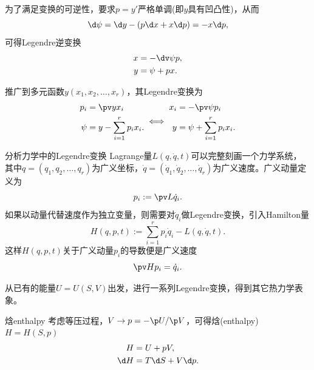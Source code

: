 \begin{corollary}
	为了满足变换的可逆性，要求$p=y'$严格单调(即$y$具有凹凸性)，从而
	\[
		\d\psi=\d y-(p\d x+x\d p)=-x\d p,
	\]
	可得Legendre逆变换
	\begin{subequations}
		\begin{align}
			x&=-\dv\psi p,\\
			y&=\psi+px.
		\end{align}
	\end{subequations}
\end{corollary}

\begin{corollary}
	推广到多元函数$y(x_1,x_2,\ldots,x_r)$，其Legendre变换为
	\[
		\begin{aligned}
			p_i  & =\pv y{x_i}            \\
			\psi & =y-\sum_{i=1}^rp_ix_i.
		\end{aligned}
		\iff
		\begin{aligned}
			x_i & =-\pv\psi{p_i}            \\
			y   & =\psi+\sum_{i=1}^rp_ix_i.
		\end{aligned}
	\]
\end{corollary}

\begin{example}{分析力学中的Legendre变换}{}
	Lagrange量$L(q,\dot q,t)$可以完整刻画一个力学系统，
	其中$q=(q_1,q_2,\ldots,q_r)$为广义坐标，$\dot q=(\dot q_1,\dot q_2,\ldots,\dot q_r)$为广义速度。广义动量定义为
	\[
		p_i:=\pv L{\dot q_i}.
	\]
	如果以动量代替速度作为独立变量，则需要对$\dot q_i$做Legendre变换，引入Hamilton量
	\begin{equation}
		H(q,p,t):=\sum_{i=1}^rp_i\dot q_i-L(q,\dot q,t).
	\end{equation}
	这样$H(q,p,t)$关于广义动量$p_i$的导数便是广义速度
	\[
		\pv H{p_i}=\dot q_i.
	\]
\end{example}

从已有的能量$U=U(S,V)$出发，进行一系列Legendre变换，得到其它热力学表象。

\begin{definition}
	{焓}{enthalpy}
	考虑等压过程，$V\to p=-\p U/\p V$，可得焓(enthalpy) $H=H(S,p)$
	\begin{subequations}
		\begin{align}
			H&=U+pV,\\
			\d H&=T\d S+V\d p.
		\end{align}
	\end{subequations}
\end{definition}

